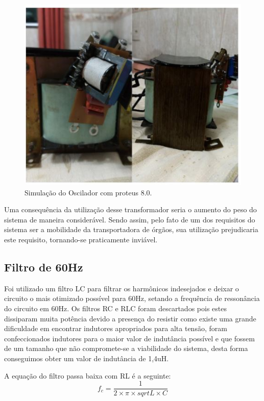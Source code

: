 	\begin{figure}[H]
		\begin{center}
			\includegraphics[scale = 0.75]{figuras/Transformador}
			\caption{ Simulação do Oscilador com proteus 8.0.}
		\end{center}
	\end{figure}
	
	
	Uma consequência da utilização desse transformador seria o aumento do peso do sistema de maneira considerável. Sendo assim, pelo fato de um dos requisitos do sistema ser a mobilidade da transportadora de órgãos, sua utilização prejudicaria este requisito, tornando-se praticamente inviável.
	
	\subsection{Filtro de 60Hz}
	Foi utilizado um filtro LC para filtrar os harmônicos indesejados e deixar o circuito o mais otimizado possível para 60Hz, setando a frequência de ressonância do circuito em 60Hz. Os filtros RC e RLC foram descartados pois estes dissiparam muita potência devido a presença do resistir como existe uma grande dificuldade em encontrar indutores apropriados para alta tensão, foram confeccionados indutores para o maior valor de indutância possível e que fossem de um tamanho que não compromete-se a viabilidade do sistema, desta forma conseguimos obter um valor de indutância de 1,4uH.
	
	A equação do filtro passa baixa com RL é a seguinte:
	\begin{equation}
	f_c = \frac{1}{2 \times \pi \times sqrt{L\times C}}
	\end{equation}
	
